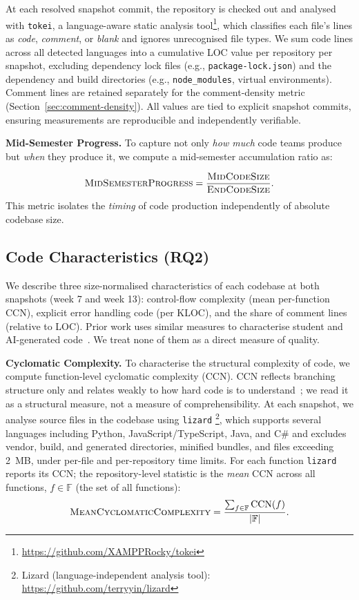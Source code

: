 \documentclass[sigconf,authorversion]{acmart}
\newcommand{\todo}[1]{#1}
\begin{document}
At each resolved snapshot commit, the repository is checked out and analysed with \texttt{tokei}, a language-aware static analysis tool\footnote{\url{https://github.com/XAMPPRocky/tokei}}, which classifies each file's lines as \emph{code}, \emph{comment}, or \emph{blank} and ignores unrecognised file types.
\todo{We sum code lines across all detected languages into a cumulative LOC value per repository per snapshot, excluding dependency lock files (e.g., \texttt{package-lock.json}) and the dependency and build directories (e.g., \texttt{node\_modules}, virtual environments). Comment lines are retained separately for the comment-density metric (Section~\ref{sec:comment-density}).}
All values are tied to explicit snapshot commits, ensuring measurements are reproducible and independently verifiable.

\textbf{Mid-Semester Progress.}
\label{sec:midsem-ratio}
To capture not only \emph{how much} code teams produce but \emph{when} they produce it, we compute a mid-semester accumulation ratio as: 

%
\[
\textsc{MidSemesterProgress} = \frac{\textsc{MidCodeSize}}{\textsc{EndCodeSize}}.
\]
%
This metric isolates the \emph{timing} of code production independently of absolute codebase size.

\subsection{Code Characteristics (RQ2)}
\label{sec:code-characteristics}
\todo{We describe three size-normalised characteristics of each codebase at both snapshots (week 7 and week 13): control-flow complexity (mean per-function CCN), explicit error handling code (per KLOC), and the share of comment lines (relative to LOC). Prior work uses similar measures to characterise student and AI-generated code~\cite{azeem2025ai, keuning2023systematic}. We treat none of them as a direct measure of quality.}

\textbf{Cyclomatic Complexity.}
\label{sec:complexity}
To characterise the structural complexity of code, we compute function-level cyclomatic complexity (CCN). \todo{CCN reflects branching structure only and relates weakly to how hard code is to understand~\cite{feitelson2023}; we read it as a structural measure, not a measure of comprehensibility.} 
At each snapshot, we analyse source files in the codebase using \texttt{lizard} \footnote {Lizard (language-independent analysis tool): \url{https://github.com/terryyin/lizard}}, which supports several languages including Python, JavaScript/TypeScript, Java, and C\# and excludes vendor, build, and generated directories, minified bundles, and files exceeding 2~MB, under per-file and per-repository time limits. For each function \texttt{lizard} reports its CCN; the repository-level statistic is the \emph{mean} CCN across all functions, $f \in \mathbb{F}$ (the set of all functions):
%
\[
\textsc{MeanCyclomaticComplexity}
=
\frac{\sum_{f \in \mathbb{F}} \mathrm{CCN}(f)}
     {|\mathbb{F}|}.
\]
%
\end{document}
